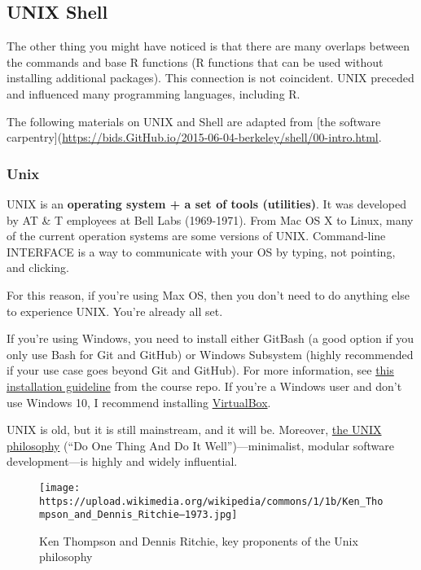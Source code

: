 \documentclass[
]{book}
\begin{document}
\hypertarget{unix-shell}{%
\subsection{UNIX Shell}\label{unix-shell}}

The other thing you might have noticed is that there are many overlaps between the commands and base R functions (R functions that can be used without installing additional packages). This connection is not coincident. UNIX preceded and influenced many programming languages, including R.

The following materials on UNIX and Shell are adapted from {[}the software carpentry{]}(\url{https://bids.GitHub.io/2015-06-04-berkeley/shell/00-intro.html}.

\hypertarget{unix}{%
\subsubsection{Unix}\label{unix}}

UNIX is an \textbf{operating system + a set of tools (utilities)}. It was developed by AT \& T employees at Bell Labs (1969-1971). From Mac OS X to Linux, many of the current operation systems are some versions of UNIX. Command-line INTERFACE is a way to communicate with your OS by typing, not pointing, and clicking.

For this reason, if you're using Max OS, then you don't need to do anything else to experience UNIX. You're already all set.

If you're using Windows, you need to install either GitBash (a good option if you only use Bash for Git and GitHub) or Windows Subsystem (highly recommended if your use case goes beyond Git and GitHub). For more information, see \href{https://GitHub.com/PS239T/spring_2021/blob/main/B_Install.md}{this installation guideline} from the course repo. If you're a Windows user and don't use Windows 10, I recommend installing \href{https://www.virtualbox.org/}{VirtualBox}.

UNIX is old, but it is still mainstream, and it will be. Moreover, \href{https://en.wikipedia.org/wiki/Unix_philosophy}{the UNIX philosophy} (``Do One Thing And Do It Well'')---minimalist, modular software development---is highly and widely influential.

\begin{figure}
\centering
\texttt{[image: https://upload.wikimedia.org/wikipedia/commons/1/1b/Ken\_Thompson\_and\_Dennis\_Ritchie--1973.jpg]}
\caption{Ken Thompson and Dennis Ritchie, key proponents of the Unix philosophy}
\end{figure}
\end{document}
